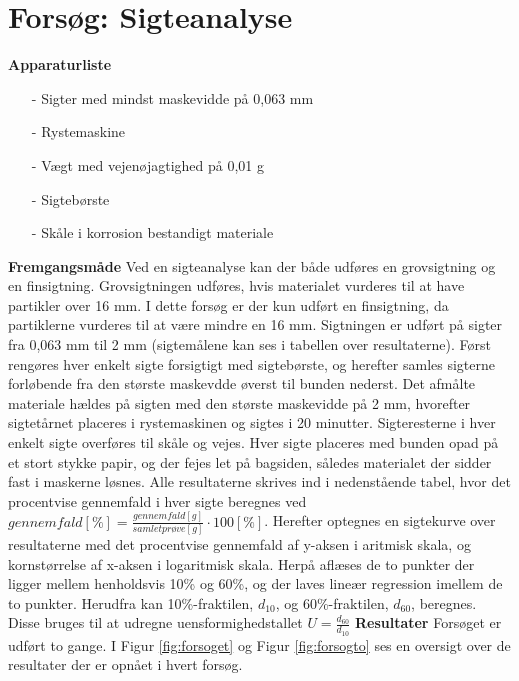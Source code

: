 \chapter{Forsøg: Sigteanalyse}

\textbf{Apparaturliste}
\begin{itemize}
	\item[-] Sigter med mindst maskevidde på 0,063 mm
	\item[-] Rystemaskine
	\item[-] Vægt med vejenøjagtighed på 0,01 g
	\item[-] Sigtebørste
	\item[-] Skåle i korrosion bestandigt materiale
\end{itemize}
\textbf{Fremgangsmåde}
\newline
Ved en sigteanalyse kan der både udføres en grovsigtning og en finsigtning. Grovsigtningen udføres, hvis materialet vurderes til at have partikler over 16 mm. I dette forsøg er der kun udført en finsigtning, da partiklerne vurderes til at være mindre en 16 mm. Sigtningen er udført på sigter fra 0,063 mm til 2 mm (sigtemålene kan ses i tabellen over resultaterne). 
\newline \indent{     }   Først rengøres hver enkelt sigte forsigtigt med sigtebørste, og herefter samles sigterne forløbende fra den største maskevdde øverst til bunden nederst. Det afmålte materiale hældes på sigten med den største maskevidde på 2 mm, hvorefter sigtetårnet placeres i rystemaskinen og sigtes i 20 minutter.
\newline \indent{     }   Sigteresterne i hver enkelt sigte overføres til skåle og vejes. Hver sigte placeres med bunden opad på et stort stykke papir, og der fejes let på bagsiden, således materialet der sidder fast i maskerne løsnes.
\newline \indent{     }   Alle resultaterne skrives ind i nedenstående tabel, hvor det procentvise gennemfald i hver sigte beregnes ved $gennemfald [\%] = \frac{gennemfald [g]}{samlet prøve [g]}\cdot 100 [\%]$. Herefter optegnes en sigtekurve over resultaterne med det procentvise gennemfald af y-aksen i aritmisk skala, og kornstørrelse af x-aksen i logaritmisk skala. Herpå aflæses de to punkter der ligger mellem henholdsvis 10\% og 60\%, og der laves lineær regression imellem de to punkter. Herudfra kan 10\%-fraktilen, $d_{10}$, og 60\%-fraktilen, $d_{60}$, beregnes. Disse bruges til at udregne uensformighedstallet $U = \frac{d_{60}}{d_{10}}$
\newline
\newline
\textbf{Resultater}
\newline
\newline
Forsøget er udført to gange. I Figur \ref{fig:forsoget} og Figur \ref{fig:forsogto} ses en oversigt over de resultater der er opnået i hvert forsøg. 

